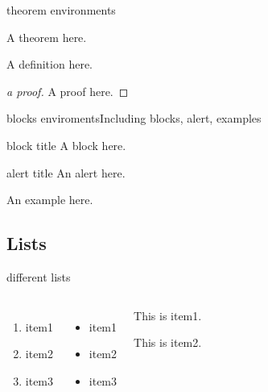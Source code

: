 \documentclass[aspectratio=169]{beamer}
\begin{document}
\begin{frame}{theorem environments}
	\begin{theorem}[a theorem]
		A theorem here.
	\end{theorem}
	
	\begin{definition}[a definition]
		A definition here.
	\end{definition}
	
	\begin{proof}[a proof]
		A proof here.
	\end{proof}
\end{frame}
	

\begin{frame}{blocks enviroments}{Including blocks, alert, examples}
	\begin{block}{block title}
		A block here.
	\end{block}
	
	\begin{alertblock}{alert title}
		An alert here.
	\end{alertblock}
	
	\begin{examples}[example]
		An example here.
	\end{examples}
\end{frame}


\subsection{Lists}
\begin{frame}[t]{different lists}
	\begin{columns}
		\begin{enumerate}
			\item item1
			\item item2
			\item item3
		\end{enumerate}
		
		\begin{itemize}
			\item item1
			\item item2
			\item item3
		\end{itemize}
		
		\pause
		
		\begin{description}[l]
			\item[item1] This is item1.
			\item[item2] This is item2.
		\end{description}	
	\end{columns}
\end{frame}
	
\end{document}
